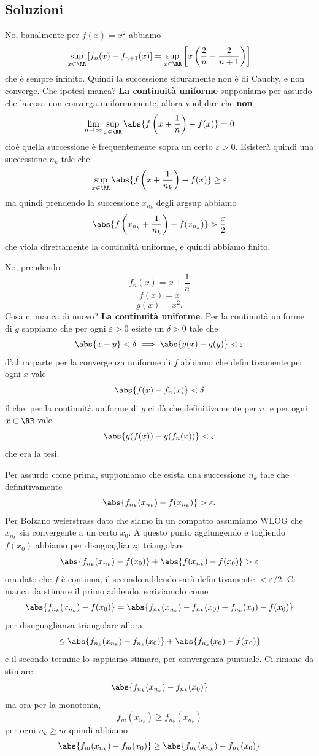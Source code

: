 \documentclass[11pt]{scrartcl}
\begin{document}
	\subsection{Soluzioni}
	
	\begin{answer}[Soluzione 1]
		No, banalmente per $f(x)=x^2$ abbiamo
		$$\sup_{x\in\RR}\left[f_n(x)-f_{n+1}(x)\right]=\sup_{x\in \RR}\left[x\left(\frac{2}{n}-\frac{2}{n+1}\right)\right]$$
		che è sempre infinito. Quindi la successione sicuramente non è di Cauchy, e non converge. Che ipotesi manca? \textbf{La continuità uniforme} supponiamo per assurdo che la cosa non converga uniformemente, allora vuol dire che \textbf{non}
		$$\lim_{n\to\infty}\sup_{x\in\RR}\abs{f\left(x+\frac{1}{n}\right)-f(x)}=0$$
		cioè quella successione è frequentemente sopra un certo $\varepsilon>0$. Esisterà quindi una successione $n_k$ tale che
		$$\sup_{x\in \RR}\abs{f\left(x+\frac{1}{n_k}\right)-f(x)}\ge \varepsilon$$
		ma quindi prendendo la successione $x_{n_k}$ degli argsup abbiamo 
		$$\abs{f\left(x_{n_k}+\frac{1}{n_k}\right)-f(x_{n_k})}>\frac{\varepsilon}{2}$$
		che viola direttamente la continuità uniforme, e quindi abbiamo finito.
	\end{answer}
	\begin{answer}[Soluzione 2]
		No, prendendo
		$$f_n(x)=x+\frac{1}{n}$$
		$$f(x)=x$$
		$$g(x)=x^2.$$
		Cosa ci manca di nuovo? \textbf{La continuità uniforme}. Per la continuità uniforme di $g$ sappiamo che per ogni $\varepsilon>0$ esiste un $\delta>0$ tale che
		$$\abs{x-y}<\delta \implies \abs{g(x)-g(y)}<\varepsilon$$
		d'altra parte per la convergenza uniforme di $f$ abbiamo che definitivamente per ogni $x$ vale
		$$\abs{f(x)-f_n(x)}<\delta$$
		il che, per la continuità uniforme di $g$ ci dà che definitivamente per $n$, e per ogni $x\in \RR$ vale
		$$\abs{g(f(x))-g(f_n(x))}<\varepsilon$$
		che era la tesi. 
	\end{answer}
	\begin{answer}[Soluzione 3]
		Per assurdo come prima, supponiamo che esista una successione $n_k$ tale che definitivamente
		$$\abs{f_{n_k}(x_{n_k})-f(x_{n_k})}>\varepsilon.$$
		Per Bolzano weierstrass dato che siamo in un compatto assumiamo WLOG che $x_{n_k}$ sia convergente a un certo $x_0$. A questo punto aggiungendo e togliendo $f(x_0)$ abbiamo per disuguaglianza triangolare
		$$\abs{f_{n_k}(x_{n_k})-f(x_0)}+\abs{f(x_{n_k})-f(x_0)}>\varepsilon$$
		ora dato che $f$ è continua, il secondo addendo sarà definitivamente $<\varepsilon/2$. Ci manca da stimare il primo addendo, scriviamolo come
		$$\abs{f_{n_k}(x_{n_k})-f(x_0)}=\abs{f_{n_k}(x_{n_k})-f_{n_k}(x_0)+f_{n_k}(x_0)-f(x_0)}$$ 
		per disuguaglianza triangolare allora
		$$\le \abs{f_{n_k}(x_{n_k})-f_{n_k}(x_0)}+\abs{f_{n_k}(x_0)-f(x_0)}$$
		e il secondo termine lo sappiamo stimare, per convergenza puntuale. Ci rimane da stimare
		$$\abs{f_{n_k}(x_{n_k})-f_{n_k}(x_0)}$$
		ma ora per la monotonia, 
		$$f_m(x_{n_k})\ge f_{n_k}(x_{n_k})$$
		per ogni $n_k\ge m$ quindi abbiamo
		$$\abs{f_m(x_{n_k})-f_m(x_0)}	\ge\abs{f_{n_k}(x_{n_k})-f_{n_k}(x_0)}$$ 
	\end{answer}
\end{document}
